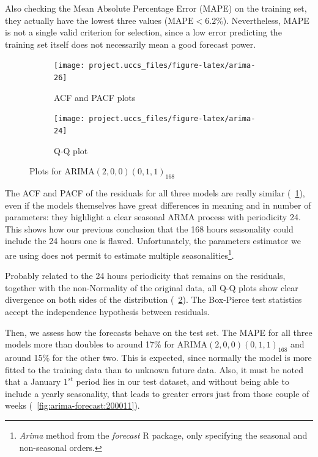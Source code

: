 \documentclass[12pt]{article}
\begin{document}
Also checking the Mean Absolute Percentage Error (MAPE) on the training set, they actually have the lowest three values ($\mathrm{MAPE} < 6.2\%$). Nevertheless, MAPE is not a single valid criterion for selection, since a low error predicting the training set itself does not necessarily mean a good forecast power.

\begin{figure}[h]
	\begin{subfigure}{.5\linewidth}
		\texttt{[image: project.uccs\_files/figure-latex/arima-26]} %
		\caption{ACF and PACF plots}
		\label{fig:arima-26}
	\end{subfigure}
	\begin{subfigure}{.5\linewidth}
		\texttt{[image: project.uccs\_files/figure-latex/arima-24]} %
		\caption{Q-Q plot}
		\label{fig:arima-24}
	\end{subfigure}
	\begin{center}
		\caption{Plots for $\mathrm{ARIMA}(2,0,0)(0,1,1)_{168}$}
		\label{fig:arima}
	\end{center}
\end{figure}

The ACF and PACF of the residuals for all three models are really similar (\figurename~\ref{fig:arima-26}), even if the models themselves have great differences in meaning and in number of parameters: they highlight a clear seasonal ARMA process with periodicity 24. This shows how our previous conclusion that the 168 hours seasonality could include the 24 hours one is flawed. Unfortunately, the parameters estimator we are using does not permit to estimate multiple seasonalities\footnote{\textit{Arima} method from the \textit{forecast} R package, only specifying the seasonal and non-seasonal orders.}.

Probably related to the 24 hours periodicity that remains on the residuals, together with the non-Normality of the original data, all Q-Q plots show clear divergence on both sides of the distribution (\figurename~\ref{fig:arima-24}). The Box-Pierce test statistics accept the independence hypothesis between residuals.

Then, we assess how the forecasts behave on the test set. The MAPE for all three models more than doubles to around 17\% for $\mathrm{ARIMA}(2,0,0)(0,1,1)_{168}$ and around 15\% for the other two. This is expected, since normally the model is more fitted to the training data than to unknown future data. Also, it must be noted that a January $1^{st}$ period lies in our test dataset, and without being able to include a yearly seasonality, that leads to greater errors just from those couple of weeks (\figurename~\ref{fig:arima-forecast:200011}).
\end{document}
